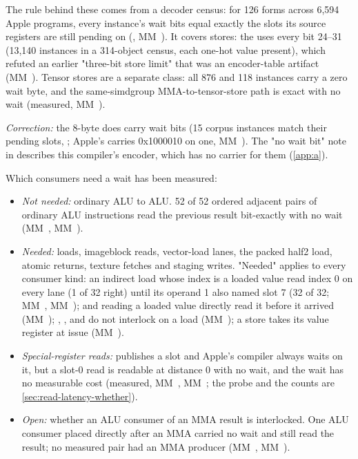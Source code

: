 The rule behind these comes from a decoder census: for 126 forms across 6,594 Apple programs, every instance's wait bits equal
exactly the slots its source registers are still pending on (, MM~). It covers
stores: the  uses every bit 24–31 (13,140 instances in a 314-object census, each one-hot
value present), which refuted an earlier "three-bit store limit" that was an encoder-table artifact (MM~). Tensor stores
are a separate class: all 876  and 118  instances carry a zero wait
byte, and the same-simdgroup MMA-to-tensor-store path is exact with no wait (measured, MM~).

\emph{Correction:} the 8-byte  does carry wait bits (15 corpus instances match their pending
slots, ; Apple's  carries 0x1000010 on one, MM~). The "no wait bit" note
in  describes this compiler's encoder, which has no carrier for them (\cref{app:a}).

Which consumers need a wait has been measured:

\begin{itemize}
\item \emph{Not needed:} ordinary ALU to ALU. 52 of 52 ordered adjacent pairs of ordinary ALU instructions read the previous
  result bit-exactly with no wait (MM~, MM~).
\item \emph{Needed:} loads, imageblock reads, vector-load lanes, the packed half2 load, atomic returns, texture fetches and staging
  writes. "Needed" applies to every consumer kind: an indirect load whose index is a loaded value read index 0 on every
  lane (1 of 32 right) until its operand 1 also named slot 7 (32 of 32; MM~, MM~);  and
   reading a loaded value directly read it before it arrived (MM~); , ,  and  do not interlock on a load
  (MM~); a store takes its value register at issue (MM~).
\item \emph{Special-register reads:}  publishes a slot and Apple's compiler always waits on it,
  but a slot-0 read is readable at distance 0 with no wait, and the wait has no measurable cost (measured, MM~, MM~; the probe and the counts are \cref{sec:read-latency-whether}).
\item \emph{Open:} whether an ALU consumer of an MMA result is interlocked. One ALU consumer placed directly after an MMA carried
  no wait and still read the result; no measured pair had an MMA producer (MM~, MM~).
\end{itemize}

